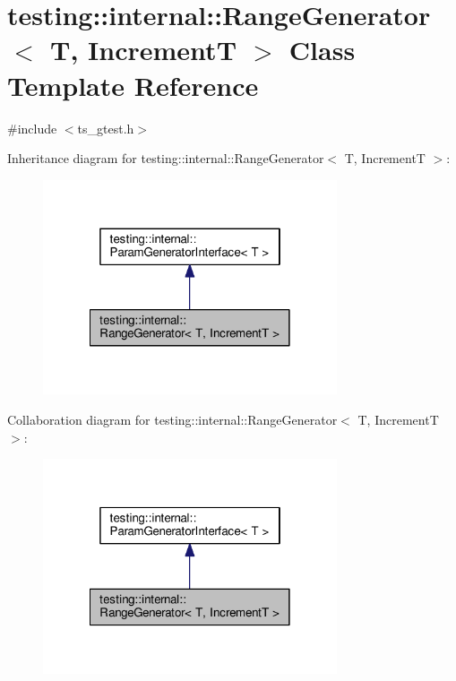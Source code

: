 \hypertarget{classtesting_1_1internal_1_1RangeGenerator}{\section{testing\-:\-:internal\-:\-:Range\-Generator$<$ T, Increment\-T $>$ Class Template Reference}
\label{classtesting_1_1internal_1_1RangeGenerator}
}


{\ttfamily \#include $<$ts\-\_\-gtest.\-h$>$}



Inheritance diagram for testing\-:\-:internal\-:\-:Range\-Generator$<$ T, Increment\-T $>$\-:\nopagebreak
\begin{figure}[H]
\begin{center}
\leavevmode
\includegraphics[width=246pt]{classtesting_1_1internal_1_1RangeGenerator__inherit__graph}
\end{center}
\end{figure}


Collaboration diagram for testing\-:\-:internal\-:\-:Range\-Generator$<$ T, Increment\-T $>$\-:\nopagebreak
\begin{figure}[H]
\begin{center}
\leavevmode
\includegraphics[width=246pt]{classtesting_1_1internal_1_1RangeGenerator__coll__graph}
\end{center}
\end{figure}
